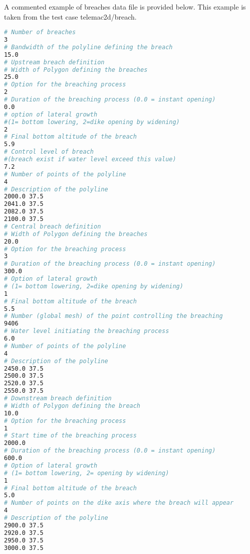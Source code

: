  A commented example of breaches data file is provided below. This example is taken from the test case telemac2d/breach.

\begin{lstlisting}[language=bash]
# Number of breaches
3
# Bandwidth of the polyline defining the breach
15.0
# Upstream breach definition
# Width of Polygon defining the breaches
25.0
# Option for the breaching process
2
# Duration of the breaching process (0.0 = instant opening)
0.0
# option of lateral growth
#(1= bottom lowering, 2=dike opening by widening)
2
# Final bottom altitude of the breach
5.9
# Control level of breach 
#(breach exist if water level exceed this value)
7.2
# Number of points of the polyline
4
# Description of the polyline
2000.0 37.5
2041.0 37.5
2082.0 37.5
2100.0 37.5
# Central breach definition
# Width of Polygon defining the breaches
20.0
# Option for the breaching process
3
# Duration of the breaching process (0.0 = instant opening)
300.0
# Option of lateral growth
# (1= bottom lowering, 2=dike opening by widening)
1
# Final bottom altitude of the breach
5.5
# Number (global mesh) of the point controlling the breaching
9406
# Water level initiating the breaching process
6.0
# Number of points of the polyline
4
# Description of the polyline
2450.0 37.5
2500.0 37.5
2520.0 37.5
2550.0 37.5
# Downstream breach definition
# Width of Polygon defining the breach
10.0
# Option for the breaching process
1
# Start time of the breaching process
2000.0
# Duration of the breaching process (0.0 = instant opening)
600.0
# Option of lateral growth
# (1= bottom lowering, 2= opening by widening)
1
# Final bottom altitude of the breach
5.0
# Number of points on the dike axis where the breach will appear
4
# Description of the polyline
2900.0 37.5
2920.0 37.5
2950.0 37.5
3000.0 37.5
\end{lstlisting}
